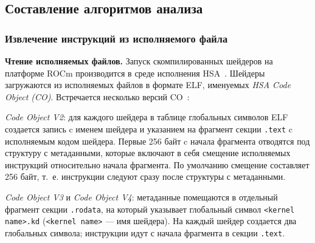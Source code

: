 \documentclass[a4paper,14pt]{extarticle}
\newcommand{\topic}[1]{\textbf{#1.}}
\begin{document}
{\subsection{Составление алгоритмов анализа}

\subsubsection{Извлечение инструкций из исполняемого файла}

\topic{Чтение исполняемых файлов} Запуск скомпилированных шейдеров на платформе ROCm
производится в среде исполнения HSA~\cite{hsa}. Шейдеры загружаются из исполняемых файлов
в формате ELF, именуемых \textit{HSA Code Object (CO)}. Встречается несколько версий CO~\cite{llvm-12-amdgpu}:

\begin{ul}
\item  \textit{Code Object V2}: для каждого шейдера в таблице
глобальных символов ELF создается запись c именем шейдера и
указанием на фрагмент секции \verb|.text| c исполняемым кодом шейдера.
Первые 256 байт c начала фрагмента отводятся под структуру с метаданными,
которые включают в себя смещение исполняемых инструкций относительно начала фрагмента.
По умолчанию смещение составляет 256 байт, т.~е. инструкции следуют сразу после структуры с метаданными.
\item \textit{Code Object V3} и \textit{Code Object V4}: метаданные помещаются в отдельный
фрагмент секции \verb|.rodata|, на который указывает глобальный символ \verb|<kernel name>.kd|
(\verb|<kernel name>| — имя шейдера). На каждый шейдер создается два
глобальных символа; инструкции идут с начала фрагмента в секции \verb|.text|.
\end{ul}

}
\end{document}
